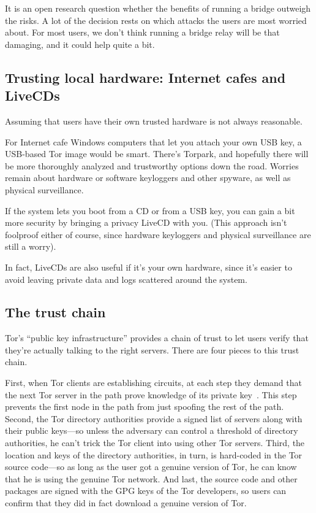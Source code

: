\documentclass{llncs}
\begin{document}
It is an open research question whether the benefits of running a bridge
outweigh the risks. A lot of the decision rests on which attacks the
users are most worried about. For most users, we don't think running a
bridge relay will be that damaging, and it could help quite a bit.

\subsection{Trusting local hardware: Internet cafes and LiveCDs}
\label{subsec:cafes-and-livecds}

Assuming that users have their own trusted hardware is not
always reasonable.

For Internet cafe Windows computers that let you attach your own USB key,
a USB-based Tor image would be smart. There's Torpark, and hopefully
there will be more thoroughly analyzed and trustworthy options down the
road. Worries remain about hardware or software keyloggers and other
spyware, as well as physical surveillance.

If the system lets you boot from a CD or from a USB key, you can gain
a bit more security by bringing a privacy LiveCD with you. (This
approach isn't foolproof either of course, since hardware
keyloggers and physical surveillance are still a worry).

In fact, LiveCDs are also useful if it's your own hardware, since it's
easier to avoid leaving private data and logs scattered around the
system.

%

\subsection{The trust chain}
\label{subsec:trust-chain}

Tor's ``public key infrastructure'' provides a chain of trust to
let users verify that they're actually talking to the right servers.
There are four pieces to this trust chain.

First, when Tor clients are establishing circuits, at each step
they demand that the next Tor server in the path prove knowledge of
its private key~\cite{tor-design}. This step prevents the first node
in the path from just spoofing the rest of the path. Second, the
Tor directory authorities provide a signed list of servers along with
their public keys---so unless the adversary can control a threshold
of directory authorities, he can't trick the Tor client into using other
Tor servers. Third, the location and keys of the directory authorities,
in turn, is hard-coded in the Tor source code---so as long as the user
got a genuine version of Tor, he can know that he is using the genuine
Tor network. And last, the source code and other packages are signed
with the GPG keys of the Tor developers, so users can confirm that they
did in fact download a genuine version of Tor.
\end{document}
